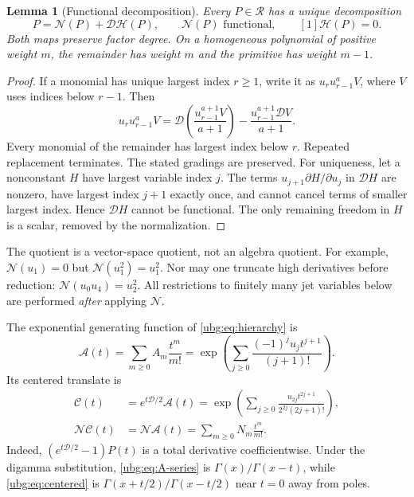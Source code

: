 \documentclass[11pt,letterpaper]{article}
\numberwithin{equation}{section}
\newtheorem{lemma}[theorem]{Lemma}
\theoremstyle{definition}\newtheorem{definition}[theorem]{Definition}
\theoremstyle{remark}\newtheorem{remark}[theorem]{Remark}
\newcommand{\D}{\mathcal D}\newcommand{\NF}{\mathcal N}\newcommand{\HF}{\mathcal H}
\newcommand{\A}{\mathcal A}\newcommand{\CC}{\mathcal C}
\begin{document}
\begin{lemma}[Functional decomposition]\label{ubg:lem:normal}
Every $P\in\mathscr R$ has a unique decomposition
\begin{equation}\label{ubg:eq:decomposition}
 P=\NF(P)+\D\HF(P),\qquad \NF(P)\text{ functional},
 \qquad [1]\HF(P)=0.
\end{equation}
Both maps preserve factor degree. On a homogeneous polynomial of
positive weight $m$, the remainder has weight $m$ and the primitive
has weight $m-1$.
\end{lemma}
\begin{proof}
If a monomial has unique largest index $r\ge1$, write it as
$u_r u_{r-1}^aV$, where $V$ uses indices below $r-1$. Then
\begin{equation}\label{ubg:eq:ibp}
 u_r u_{r-1}^aV
 =\D\left(\frac{u_{r-1}^{a+1}V}{a+1}\right)
       -\frac{u_{r-1}^{a+1}\D V}{a+1}.
\end{equation}
Every monomial of the remainder has largest index below $r$.
Repeated replacement terminates. The stated gradings are preserved.
For uniqueness, let a nonconstant $H$ have largest variable index $j$.
The terms $u_{j+1}\partial H/\partial u_j$ in $\D H$ are nonzero,
have largest index $j+1$ exactly once, and cannot cancel terms of
smaller largest index. Hence $\D H$ cannot be functional. The only
remaining freedom in $H$ is a scalar, removed by the normalization.
\end{proof}

The quotient is a vector-space quotient, not an algebra quotient.
For example, $\NF(u_1)=0$ but $\NF(u_1^2)=u_1^2$.
Nor may one truncate high derivatives before reduction:
$\NF(u_0u_4)=u_2^2$. All restrictions to finitely many jet variables
below are performed \emph{after} applying $\NF$.

The exponential generating function of \eqref{ubg:eq:hierarchy} is
\begin{equation}\label{ubg:eq:A-series}
 \A(t)=\sum_{m\ge0}A_m\frac{t^m}{m!}
 =\exp\left(\sum_{j\ge0}\frac{(-1)^j u_jt^{j+1}}{(j+1)!}\right).
\end{equation}
Its centered translate is
\begin{align}
 \CC(t)&=e^{t\D/2}\A(t)
 =\exp\left(\sum_{j\ge0}
       \frac{u_{2j}t^{2j+1}}{2^{2j}(2j+1)!}\right),
 \label{ubg:eq:centered}\\
 \NF\CC(t)&=\NF\A(t)=\sum_{m\ge0}N_m\frac{t^m}{m!}.
 \label{ubg:eq:same-normal}
\end{align}
Indeed, $(e^{t\D/2}-1)P(t)$ is a total derivative coefficientwise.
Under the digamma substitution, \eqref{ubg:eq:A-series} is
$\Gamma(x)/\Gamma(x-t)$, while \eqref{ubg:eq:centered} is
$\Gamma(x+t/2)/\Gamma(x-t/2)$ near $t=0$ away from poles.
\end{document}
